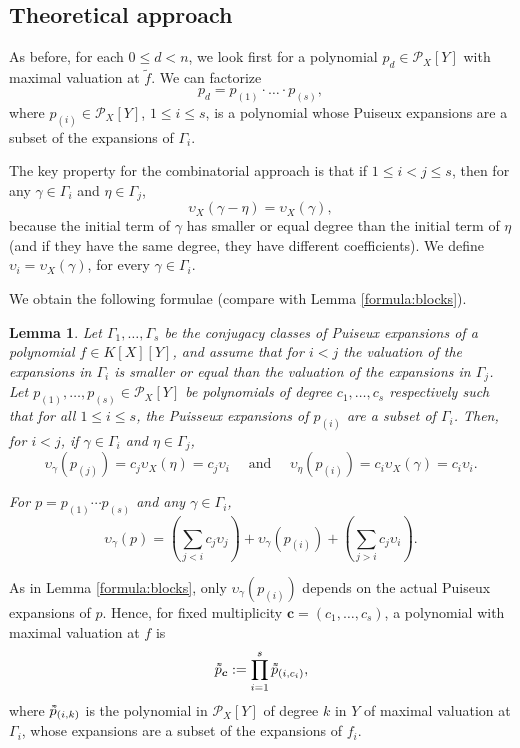 \documentclass[a4paper,11pt]{amsart}%
\theoremstyle{definition}
\theoremstyle{plain}
\newtheorem{lemma}[defn]{Lemma}
\theoremstyle{remark}
\newcommand{\Px}{{\mathcal{P}_X}}
\newcommand{\vardbtilde}[1]{\tilde{\raisebox{0pt}[0.85\height]{$\tilde{#1}$}}}
\begin{document}
\subsection{Theoretical approach}
As before, for each $0 \le d < n$, we look first for a polynomial $p_d \in \Px[Y]$ with maximal valuation at $\tilde f$. We can factorize
$$
p_d = p_{(1)} \cdot \dots \cdot p_{(s)},
$$
where $p_{(i)} \in \Px[Y]$, $1 \le i \le s$, is a polynomial whose Puiseux expansions are a subset of the expansions of $\Gamma_i$.

The key
property for the combinatorial approach is that if $1 \leq i < j \leq s$, then for any $\gamma \in\Gamma_{i}$ and $\eta \in \Gamma_{j}$,
$$\upsilon_X(\gamma - \eta) = \upsilon_X(\gamma),$$
because the initial term of $\gamma$ has smaller or equal degree than the initial term of $\eta$ (and if they have the same degree, they have different coefficients). We define $\upsilon_i = \upsilon_X(\gamma)$, for every $\gamma \in \Gamma_i$.

We obtain the following formulae (compare with Lemma \ref{formula:blocks}).
\begin{lemma}
\label{formula:sets}
Let $\Gamma_1, \dots, \Gamma_s$ be the conjugacy classes of Puiseux expansions of a polynomial $f \in K[X][Y]$, and assume that for $i < j$ the valuation of the expansions in $\Gamma_i$ is smaller or equal than the valuation of the expansions in $\Gamma_j$. Let $p_{(1)}, \dots, p_{(s)} \in \mathcal{P}_{X}[Y]$ be polynomials of degree $c_1, \dots, c_s$ respectively such that for all $1 \le i \le s$, the Puisseux expansions of $p_{(i)}$ are a subset of $\Gamma_i$. Then, for $i < j$, if $\gamma \in \Gamma_i$ and $\eta \in \Gamma_j$,
$$
\upsilon_{\gamma}(p_{(j)}) = c_j \upsilon_X(\eta) = c_j \upsilon_i \quad \text{ and } \quad \upsilon_{\eta}(p_{(i)}) = c_i \upsilon_X(\gamma) = c_i \upsilon_i.
$$

For $p = p_{(1)} \cdots p_{(s)}$ and any $\gamma \in \Gamma_i$,
\[
\boxed{
\upsilon_{\gamma}(p) = \left(\textstyle \sum_{j < i} c_j \upsilon_j\right) + \upsilon_{\gamma}(p_{(i)}) + \left(\textstyle  \sum_{j > i} c_j \upsilon_i \right).}
\]
\end{lemma}

As in Lemma \ref{formula:blocks}, only $\upsilon_{\gamma}(p_{(i)})$ depends on the actual Puiseux expansions of $p$. Hence, for fixed multiplicity $\bm{c} = (c_1, \dots, c_s)$, a polynomial with
maximal valuation at $f$ is
$$\vardbtilde p_{\bm c} := \prod_{i = 1}^s \vardbtilde p_{(i, c_i)},$$
where $\vardbtilde p_{(i, k)}$ is the polynomial in $\mathcal{P}_{X}[Y]$ of degree $k$ in $Y$ of maximal valuation at $\Gamma_i$, whose expansions are a subset of the expansions of $f_i$.
\end{document}

